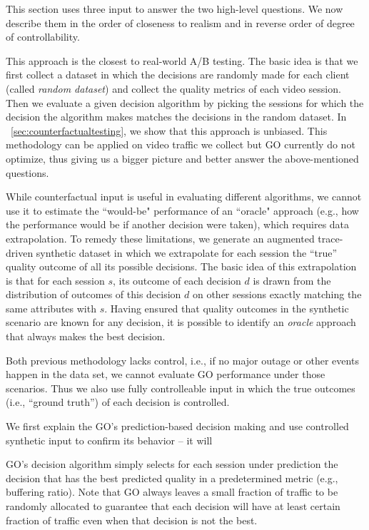 This section uses three input to answer the two high-level questions. We now describe them in the order of closeness to realism and in reverse order of degree of controllability.

 This approach is the closest to real-world A/B testing. The basic idea is that we first collect a dataset in which the decisions are randomly made for each client (called {\it random dataset}) and collect the quality metrics of each video session. Then we evaluate a given decision algorithm by picking the sessions for which the decision the algorithm makes matches the decisions in the random dataset. In \Section~\ref{sec:counterfactualtesting}, we show that this approach is unbiased. This methodology can be applied on video traffic we collect but GO currently do not optimize, thus giving us a bigger picture and better answer the above-mentioned questions. 

 While counterfactual input is useful in evaluating different algorithms, we cannot use it to estimate the ``would-be" performance of an ``oracle" approach (e.g., how the performance would be if another decision were taken), which requires data extrapolation. To remedy these limitations, we generate an augmented trace-driven synthetic dataset in which we extrapolate for each session the ``true'' quality outcome of all its possible decisions. The basic idea of this extrapolation  is that for each session $s$, its outcome of each decision $d$ is drawn from the distribution of outcomes of this decision $d$ on other sessions exactly matching the same attributes with $s$. Having ensured that quality outcomes in the synthetic scenario are known for any decision, it is possible to identify an {\it oracle} approach that always makes the best decision.

 Both previous methodology lacks control, i.e., if no major outage or other events happen in the data set, we cannot evaluate GO performance under those scenarios.  Thus we also use fully controlleable input in which the true outcomes (i.e., ``ground truth'') of each decision is controlled.





We first explain the GO's prediction-based decision making and use controlled synthetic input to confirm its behavior -- it will 

 GO's decision algorithm simply selects for each session under prediction the decision that has the best predicted quality in a predetermined metric (e.g., buffering ratio). Note that GO always leaves a small fraction of traffic to be randomly allocated to guarantee that each decision will have at least certain fraction of traffic even when that decision is not the best.




